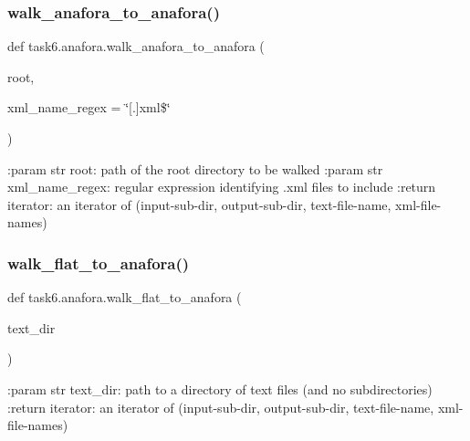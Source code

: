 \subsubsection{\texorpdfstring{walk\+\_\+anafora\+\_\+to\+\_\+anafora()}{walk\_anafora\_to\_anafora()}}
{\footnotesize\ttfamily def task6.\+anafora.\+walk\+\_\+anafora\+\_\+to\+\_\+anafora (\begin{DoxyParamCaption}\item[{}]{root,  }\item[{}]{xml\+\_\+name\+\_\+regex = {\ttfamily \char`\"{}\mbox{[}.\mbox{]}xml\$\char`\"{}} }\end{DoxyParamCaption})}

\begin{DoxyVerb}:param str root: path of the root directory to be walked
:param str xml_name_regex: regular expression identifying .xml files to include
:return iterator: an iterator of (input-sub-dir, output-sub-dir, text-file-name, xml-file-names)
\end{DoxyVerb}
 \mbox{\label{namespacetask6_1_1anafora_a805515fcdc638cb1994074e6450e498d}} 
\subsubsection{\texorpdfstring{walk\+\_\+flat\+\_\+to\+\_\+anafora()}{walk\_flat\_to\_anafora()}}
{\footnotesize\ttfamily def task6.\+anafora.\+walk\+\_\+flat\+\_\+to\+\_\+anafora (\begin{DoxyParamCaption}\item[{}]{text\+\_\+dir }\end{DoxyParamCaption})}

\begin{DoxyVerb}:param str text_dir: path to a directory of text files (and no subdirectories)
:return iterator: an iterator of (input-sub-dir, output-sub-dir, text-file-name, xml-file-names)
\end{DoxyVerb}
 